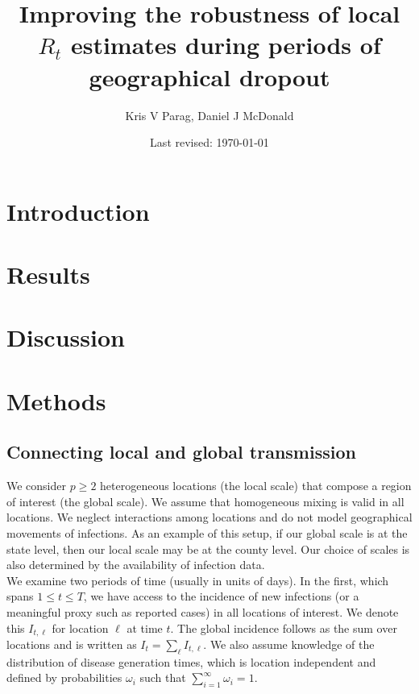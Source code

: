 \documentclass[12pt]{article}
\title{\huge Improving the robustness of local $R_t$ estimates during periods of geographical dropout}
\author{Kris V Parag, Daniel J McDonald}
\date{Last revised: \today}
\begin{document}
\maketitle

\section*{Introduction}


\section*{Results}


\section*{Discussion}


\section*{Methods}
\subsection*{Connecting local and global transmission}\label{sec:bayes}

We consider $p\geq 2$ heterogeneous locations (the local scale) that compose a region of interest (the global scale). We assume that homogeneous mixing is valid in all locations. We neglect interactions among locations and do not model geographical movements of infections. As an example of this setup, if our global scale is at the state level, then our local scale may be at the county level. Our choice of scales is also determined by the availability of infection data.\\

We examine two periods of time (usually in units of days). In the first, which spans $1\leq t \leq T$, we have access to the incidence of new infections (or a meaningful proxy such as reported cases) in all locations of interest. We denote this $I_{t, \ell}$ for location $\ell$ at time $t$. The global incidence follows as the sum over locations and is written as $I_t = \sum_{\ell} I_{t, \ell}$. We also assume knowledge of the distribution of disease generation times, which is location independent and defined by probabilities $\omega_i$ such that $\sum_{i=1}^{\infty}\omega_{i} = 1$.\\
\end{document}
